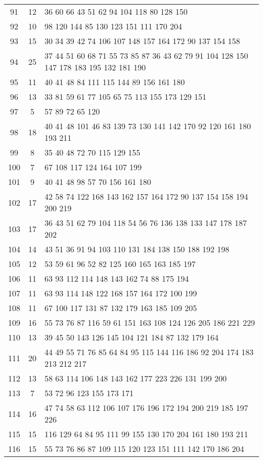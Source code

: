 \documentclass{standalone}
\begin{document}
\begin{tabular}{c c l}
91 & 12 & 36 60 66 43 51 62 94 104 118 80 128 150 \\
92 & 10 & 98 120 144 85 130 123 151 111 170 204 \\
93 & 15 & 30 34 39 42 74 106 107 148 157 164 172 90 137 154 158 \\
94 & 25 & 37 44 51 60 68 71 55 73 85 87 36 43 62 79 91 104 128 150 147 178 183 195 132 181 190 \\
95 & 11 & 40 41 48 84 111 115 144 89 156 161 180 \\
96 & 13 & 33 81 59 61 77 105 65 75 113 155 173 129 151 \\
97 & 5 & 57 89 72 65 120 \\
98 & 18 & 40 41 48 101 46 83 139 73 130 141 142 170 92 120 161 180 193 211 \\
99 & 8 & 35 40 48 72 70 115 129 155 \\
100 & 7 & 67 108 117 124 164 107 199 \\
101 & 9 & 40 41 48 98 57 70 156 161 180 \\
102 & 17 & 42 58 74 122 168 143 162 157 164 172 90 137 154 158 194 200 219 \\
103 & 17 & 36 43 51 62 79 104 118 54 56 76 136 138 133 147 178 187 202 \\
104 & 14 & 43 51 36 91 94 103 110 131 184 138 150 188 192 198 \\
105 & 12 & 53 59 61 96 52 82 125 160 165 163 185 197 \\
106 & 11 & 63 93 112 114 148 143 162 74 88 175 194 \\
107 & 11 & 63 93 114 148 122 168 157 164 172 100 199 \\
108 & 11 & 67 100 117 131 87 132 179 163 185 109 205 \\
109 & 16 & 55 73 76 87 116 59 61 151 163 108 124 126 205 186 221 229 \\
110 & 13 & 39 45 50 143 126 145 104 121 184 87 132 179 164 \\
111 & 20 & 44 49 55 71 76 85 64 84 95 115 144 116 186 92 204 174 183 213 212 217 \\
112 & 13 & 58 63 114 106 148 143 162 177 223 226 131 199 200 \\
113 & 7 & 53 72 96 123 155 173 171 \\
114 & 16 & 47 74 58 63 112 106 107 176 196 172 194 200 219 185 197 226 \\
115 & 15 & 116 129 64 84 95 111 99 155 130 170 204 161 180 193 211 \\
116 & 15 & 55 73 76 86 87 109 115 120 123 151 111 142 170 186 204 \\

\end{tabular}
\end{document}
